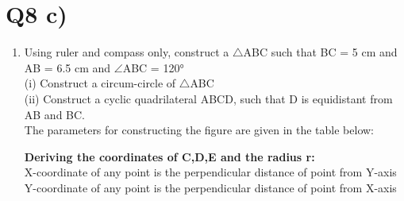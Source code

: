 \documentclass[journal,12pt,twocolumn]{IEEEtran}
\renewcommand\thesection{\arabic{section}}
\begin{document}
\section{Q8 c)}
\begin{enumerate}[label=\thesection.\arabic*.,ref=\thesection.\theenumi]
\item Using ruler and compass only, construct a $\bigtriangleup$ABC such that BC = 5 cm
and AB = 6.5 cm and $\angle$ABC = 120°\\
(i) Construct a circum-circle of $\bigtriangleup$ABC\\
(ii) Construct a cyclic quadrilateral ABCD, such that D is equidistant from AB and BC.\\

\solution The parameters for constructing the figure are given in the table below:

\begin{table}[h]
\centering
\caption{}
 	
\end{table}

\textbf{Deriving the coordinates of C,D,E and the radius r:}\\

X-coordinate of any point is the perpendicular distance of point from Y-axis\\
Y-coordinate of any point is the perpendicular distance of point from X-axis\\


\end{enumerate}
\end{document}
